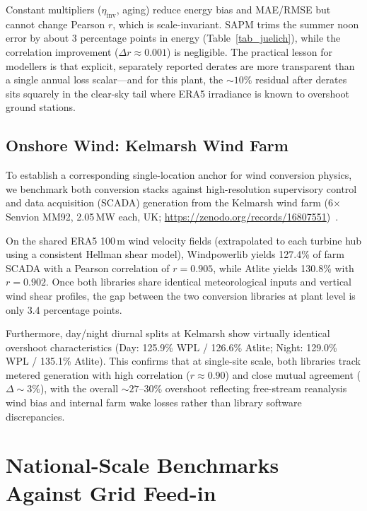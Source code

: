 \documentclass[preprint,12pt,number]{elsarticle}
\begin{document}
Constant multipliers ($\eta_{\mathrm{inv}}$, aging) reduce energy bias and MAE/RMSE but cannot change Pearson $r$, which is scale-invariant.
SAPM trims the summer noon error by about $3$ percentage points in energy (Table~\ref{tab_juelich}), while the correlation improvement ($\Delta r \approx 0.001$) is negligible.
The practical lesson for modellers is that explicit, separately reported derates are more transparent than a single annual loss scalar---and for this plant, the $\sim$$10\%$ residual after derates sits squarely in the clear-sky tail where ERA5 irradiance is known to overshoot ground stations.

\subsection{Onshore Wind: Kelmarsh Wind Farm}
\label{sec:kelmarsh}

To establish a corresponding single-location anchor for wind conversion physics, we benchmark both conversion stacks against high-resolution supervisory control and data acquisition (SCADA) generation from the Kelmarsh wind farm (6$\times$Senvion MM92, 2.05\,MW each, UK; \url{https://zenodo.org/records/16807551})~\citep{KelmarshSCADA}.

On the shared ERA5 100\,m wind velocity fields (extrapolated to each turbine hub using a consistent Hellman shear model), Windpowerlib yields 127.4\% of farm SCADA with a Pearson correlation of $r = 0.905$, while Atlite yields 130.8\% with $r = 0.902$.
Once both libraries share identical meteorological inputs and vertical wind shear profiles, the gap between the two conversion libraries at plant level is only 3.4 percentage points.

Furthermore, day/night diurnal splits at Kelmarsh show virtually identical overshoot characteristics (Day: 125.9\% WPL / 126.6\% Atlite; Night: 129.0\% WPL / 135.1\% Atlite).
This confirms that at single-site scale, both libraries track metered generation with high correlation ($r \approx 0.90$) and close mutual agreement ($\Delta \sim 3\%$), with the overall $\sim 27\text{--}30\%$ overshoot reflecting free-stream reanalysis wind bias and internal farm wake losses rather than library software discrepancies.

\section{National-Scale Benchmarks Against Grid Feed-in}
\label{sec:national}
\end{document}
